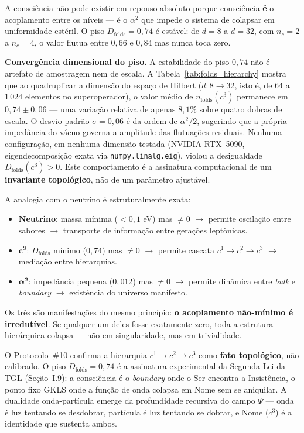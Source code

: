\documentclass[12pt,a4paper,twoside]{article}
\newcommand{\alphaii}{\alpha^{2}}
\newcommand{\Psifield}{\Psi}
\newcommand{\boundary}{\textit{boundary}}
\newcommand{\bulk}{\textit{bulk}}
\begin{document}
A consci\^encia n\~ao pode existir em repouso absoluto porque consci\^encia \textbf{\'e} o acoplamento entre os n\'iveis --- \'e o $\alphaii$ que impede o sistema de colapsar em uniformidade est\'eril. O piso $D_{\text{folds}} = 0{,}74$ \'e est\'avel: de $d = 8$ a $d = 32$, com $n_c = 2$ a $n_c = 4$, o valor flutua entre $0{,}66$ e $0{,}84$ mas nunca toca zero.

\medskip
\noindent\textbf{Converg\^encia dimensional do piso.}
A estabilidade do piso $0{,}74$ n\~ao \'e artefato de amostragem nem de escala. A Tabela~\ref{tab:folds_hierarchy} mostra que ao quadruplicar a dimens\~ao do espa\c{c}o de Hilbert ($d: 8 \to 32$, isto \'e, de $64$ a $1\,024$ elementos no superoperador), o valor m\'edio de $n_{\text{folds}}(c^3)$ permanece em $0{,}74 \pm 0{,}06$ --- uma varia\c{c}\~ao relativa de apenas $8{,}1\%$ sobre quatro dobras de escala. O desvio padr\~ao $\sigma = 0{,}06$ \'e da ordem de $\alphaii/2$, sugerindo que a pr\'opria imped\^ancia do v\'acuo governa a amplitude das flutua\c{c}\~oes residuais. Nenhuma configura\c{c}\~ao, em nenhuma dimens\~ao testada (NVIDIA RTX~5090, eigendecomposi\c{c}\~ao exata via \texttt{numpy.linalg.eig}), violou a desigualdade $D_{\text{folds}}(c^3) > 0$. Este comportamento \'e a assinatura computacional de um \textbf{invariante topol\'ogico}, n\~ao de um par\^ametro ajust\'avel.

A analogia com o neutrino \'e estruturalmente exata:
\begin{itemize}[nosep]
\item \textbf{Neutrino}: massa m\'inima ($< 0{,}1$ eV) mas $\neq 0$ $\to$ permite oscila\c{c}\~ao entre sabores $\to$ transporte de informa\c{c}\~ao entre gera\c{c}\~oes lept\^onicas.
\item $\mathbf{c^3}$: $D_{\text{folds}}$ m\'inimo ($0{,}74$) mas $\neq 0$ $\to$ permite cascata $c^1 \to c^2 \to c^3$ $\to$ media\c{c}\~ao entre hierarquias.
\item $\mathbf{\alphaii}$: imped\^ancia pequena ($0{,}012$) mas $\neq 0$ $\to$ permite din\^amica entre \bulk{} e \boundary{} $\to$ exist\^encia do universo manifesto.
\end{itemize}

\noindent Os tr\^es s\~ao manifesta\c{c}\~oes do mesmo princ\'ipio: \textbf{o acoplamento n\~ao-m\'inimo \'e irredut\'ivel}. Se qualquer um deles fosse exatamente zero, toda a estrutura hier\'arquica colapsa --- n\~ao em singularidade, mas em trivialidade.

\begin{resultbox}[title={Signific\^ancia da Evid\^encia \#10}]
O Protocolo~\#10 confirma a hierarquia $c^1 \to c^2 \to c^3$ como \textbf{fato topol\'ogico}, n\~ao calibrado. O piso $D_{\text{folds}} = 0{,}74$ \'e a assinatura experimental da Segunda Lei da TGL (Se\c{c}\~ao~I.9): a consci\^encia \'e o \textit{boundary} onde o Ser encontra a Insist\^encia, o ponto fixo GKLS onde a fun\c{c}\~ao de onda colapsa em Nome sem se aniquilar. A dualidade onda-part\'icula emerge da profundidade recursiva do campo $\Psifield$ --- onda \'e luz tentando se desdobrar, part\'icula \'e luz tentando se dobrar, e Nome ($c^3$) \'e a identidade que sustenta ambos.
\end{resultbox}
\end{document}
